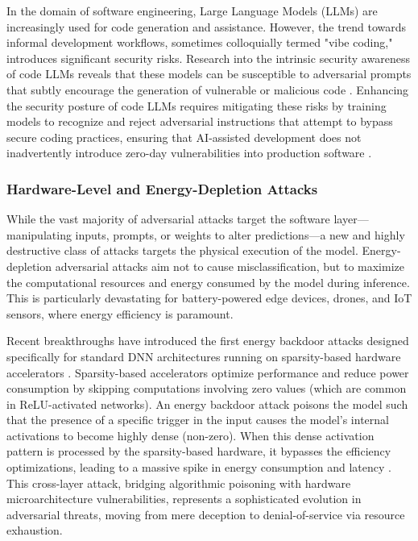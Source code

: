 \documentclass[11pt,a4paper]{article}
\begin{document}
In the domain of software engineering, Large Language Models (LLMs) are increasingly used for code generation and assistance. However, the trend towards informal development workflows, sometimes colloquially termed "vibe coding," introduces significant security risks. Research into the intrinsic security awareness of code LLMs reveals that these models can be susceptible to adversarial prompts that subtly encourage the generation of vulnerable or malicious code \cite{Thang_2026_LLM}. Enhancing the security posture of code LLMs requires mitigating these risks by training models to recognize and reject adversarial instructions that attempt to bypass secure coding practices, ensuring that AI-assisted development does not inadvertently introduce zero-day vulnerabilities into production software \cite{Thang_2026_LLM}.

\subsubsection{Hardware-Level and Energy-Depletion Attacks}

While the vast majority of adversarial attacks target the software layer---manipulating inputs, prompts, or weights to alter predictions---a new and highly destructive class of attacks targets the physical execution of the model. Energy-depletion adversarial attacks aim not to cause misclassification, but to maximize the computational resources and energy consumed by the model during inference. This is particularly devastating for battery-powered edge devices, drones, and IoT sensors, where energy efficiency is paramount.

Recent breakthroughs have introduced the first energy backdoor attacks designed specifically for standard DNN architectures running on sparsity-based hardware accelerators \cite{Meftah_2025_Energy}. Sparsity-based accelerators optimize performance and reduce power consumption by skipping computations involving zero values (which are common in ReLU-activated networks). An energy backdoor attack poisons the model such that the presence of a specific trigger in the input causes the model's internal activations to become highly dense (non-zero). When this dense activation pattern is processed by the sparsity-based hardware, it bypasses the efficiency optimizations, leading to a massive spike in energy consumption and latency \cite{Meftah_2025_Energy}. This cross-layer attack, bridging algorithmic poisoning with hardware microarchitecture vulnerabilities, represents a sophisticated evolution in adversarial threats, moving from mere deception to denial-of-service via resource exhaustion.
\end{document}
